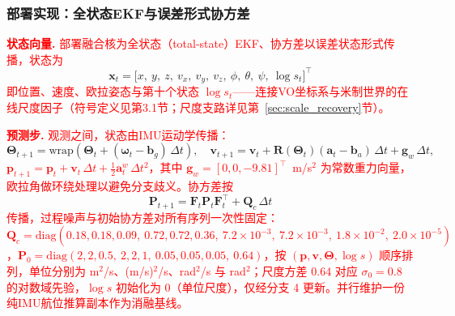 \subsubsection{部署实现：全状态EKF与误差形式协方差}

\textcolor{red}{\textbf{状态向量.} 部署融合核为全状态（total-state）EKF、协方差以误差状态形式传播，状态为}
\begin{equation}
    \mathbf{x}_t = \big[x,\ y,\ z,\ v_x,\ v_y,\ v_z,\ \phi,\ \theta,\ \psi,\ \log s_t\big]^{\top}
\end{equation}
\textcolor{red}{即位置、速度、欧拉姿态与第十个状态 $\log s_t$——连接VO坐标系与米制世界的在线尺度因子（符号定义见第3.1节；尺度支路详见第~\ref{sec:scale_recovery}节）。}

\textcolor{red}{\textbf{预测步.} 观测之间，状态由IMU运动学传播：}
\begin{equation}
    \boldsymbol{\Theta}_{t+1} = \mathrm{wrap}\!\left(\boldsymbol{\Theta}_t + (\boldsymbol{\omega}_t - \mathbf{b}_g)\,\Delta t\right),\quad
    \mathbf{v}_{t+1} = \mathbf{v}_t + \mathbf{R}(\boldsymbol{\Theta}_t)(\mathbf{a}_t - \mathbf{b}_a)\,\Delta t + \mathbf{g}_w\,\Delta t,
\end{equation}
\textcolor{red}{$\mathbf{p}_{t+1} = \mathbf{p}_t + \mathbf{v}_t\,\Delta t + \tfrac{1}{2}\mathbf{a}^w_t\,\Delta t^2$，其中 $\mathbf{g}_w = [0, 0, -9.81]^\top$~m/s$^2$ 为常数重力向量，欧拉角做环绕处理以避免分支歧义。协方差按}
\begin{equation}
    \mathbf{P}_{t+1} = \mathbf{F}_t \mathbf{P}_t \mathbf{F}_t^\top + \mathbf{Q}_c\,\Delta t
\end{equation}
\textcolor{red}{传播，过程噪声与初始协方差对所有序列一次性固定：$\mathbf{Q}_c = \mathrm{diag}(0.18, 0.18, 0.09,\ 0.72, 0.72, 0.36,\ 7.2{\times}10^{-3},\ 7.2{\times}10^{-3},\ 1.8{\times}10^{-2},\ 2.0{\times}10^{-5})$，$\mathbf{P}_0 = \mathrm{diag}(2, 2, 0.5,\ 2, 2, 1,\ 0.05, 0.05, 0.05,\ 0.64)$，按 $(\mathbf{p}, \mathbf{v}, \boldsymbol{\Theta}, \log s)$ 顺序排列，单位分别为 m$^2$/s、(m/s)$^2$/s、rad$^2$/s 与 rad$^2$；尺度方差 0.64 对应 $\sigma_0 = 0.8$ 的对数域先验，$\log s$ 初始化为 0（单位尺度），仅经分支 4 更新。并行维护一份纯IMU航位推算副本作为消融基线。}

